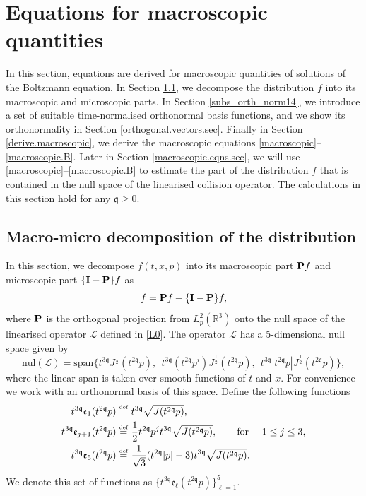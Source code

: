 \documentclass[reqno]{amsart}
\newcommand{\eqdef }{\overset{\mbox{\tiny{def}}}{=}}
\newcommand{\pv}{p}
\newcommand{\pZ}{|\pv|}
\newcommand{\rth}{{\mathbb{R}^3}}
\newcommand{\qq}{\mathfrak{q}}
\newcommand{\tqq}{t^{2\qq}}
\newcommand{\tTq}{t^{3\qq}}
\newcommand{\linL}{\mathcal{L}}
\newcommand{\macro}{{\bf P}}
\newcommand{\micro}{{\bf \{I- P\}}}
\theoremstyle{definition}
\numberwithin{equation}{section}
\numberwithin{theorem}{section}
\begin{document}
\section{Equations for macroscopic quantities}\label{sectionmacromicro}

In this section, equations are derived for macroscopic quantities of solutions of the Boltzmann equation. In Section \ref{subsec_macromicro}, we decompose the distribution \(f\) into its macroscopic and microscopic parts. In Section \ref{subs_orth_norm14}, we introduce a set of suitable time-normalised orthonormal basis functions, and we show its orthonormality in Section \ref{orthogonal.vectors.sec}. Finally in Section \ref{derive.macroscopic}, we derive the macroscopic equations \eqref{macroscopic}--\eqref{macroscopic.B}.  Later in Section \ref{macroscopic.eqns.sec}, we will use \eqref{macroscopic}--\eqref{macroscopic.B} to estimate the  part of the distribution \(f\) that is contained in the null space of the linearised collision operator.    The calculations in this section hold for any $\qq \ge 0$. 

\subsection{Macro-micro decomposition of the distribution}\label{subsec_macromicro}



In this section, we decompose $f(t,x,p)$ into its macroscopic part \(\macro f\) and microscopic part \(\micro f\) as
\begin{equation}
\label{decomp}
f=\macro f+\micro f,
\end{equation}
where \(\macro\) is the orthogonal projection from $L^2_p(\rth)$ onto the null space of the linearised operator $\linL$ defined in \eqref{L0}.  The operator $\linL$ has a 5-dimensional null space given by
\[
\mathrm{nul}(\linL)=\mathrm{span}\Big\{ \tTq J^{\frac{1}{2}}(\tqq p),~~\tTq (\tqq p^{i})  J^{\frac{1}{2}}(\tqq p),  ~~
\tTq |\tqq \pv |J^{\frac{1}{2}}(\tqq p)\Big\},
\]
where the linear span is taken over smooth functions of \(t\) and \(x\). For convenience we work with an orthonormal basis of this space. Define the following functions
\begin{align} \notag
   \tTq \mathfrak{e}_1(\tqq \pv) \eqdef &~ \tTq\sqrt{J(\tqq p)},
   \\ 
   \tTq \mathfrak{e}_{j+1}(\tqq \pv) \eqdef &~ 
   \frac{1}{2}\tqq \pv^j \tTq\sqrt{J(\tqq p)},\qquad \text{for }\quad 1\leq j \leq 3, \label{orthogonal.basis.kernel}
   \\ \notag
   \tTq \mathfrak{e}_5(\tqq \pv) \eqdef &~ \frac{1}{\sqrt{3}}(\tqq\pZ-3)\tTq\sqrt{J(\tqq p)}.
\end{align}
We denote this set of functions as $\{ \tTq\mathfrak{e}_\ell(\tqq p)\}_{\ell=1}^5$.
\end{document}

